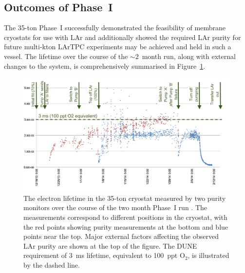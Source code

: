 \subsection{Outcomes of Phase~I}\label{sec:35tonPhaseIOutcomes}

The 35-ton Phase~I successfully demonstrated the feasibility of membrane cryostats for use with LAr and additionally showed the required LAr purity for future multi-kton LArTPC experiments may be achieved and held in such a vessel.  The lifetime over the course of the $\sim2$~month run, along with external changes to the system, is comprehensively summarised in Figure~\ref{fig:35tonPhaseIElectronLifetime}.

\begin{figure}
  \centering
  \includegraphics[width=12cm]{35tonPhaseIElectronLifetimeEdit.png}
  \caption[The electron lifetime in the 35-ton cryostat measured by two purity monitors over the course of the two month Phase~I run.]{The electron lifetime in the 35-ton cryostat measured by two purity monitors over the course of the two month Phase~I run \cite{35tonPhaseI2014}.  The measurements correspond to different positions in the cryostat, with the red points showing purity measurements at the bottom and blue points near the top.  Major external factors affecting the observed LAr purity are shown at the top of the figure.  The DUNE requirement of 3~ms lifetime, equivalent to 100~ppt O$_2$, is illustrated by the dashed line.}
  \label{fig:35tonPhaseIElectronLifetime}
\end{figure}

